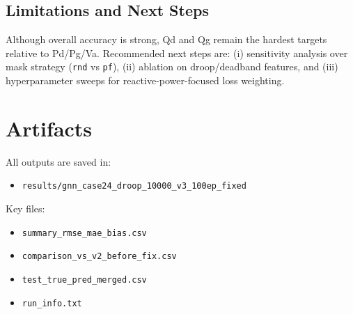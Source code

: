 \documentclass[11pt]{article}
\begin{document}
\subsection{Limitations and Next Steps}
Although overall accuracy is strong, Qd and Qg remain the hardest targets relative to Pd/Pg/Va. Recommended next steps are: (i) sensitivity analysis over mask strategy (\texttt{rnd} vs \texttt{pf}), (ii) ablation on droop/deadband features, and (iii) hyperparameter sweeps for reactive-power-focused loss weighting.

\section*{Artifacts}
All outputs are saved in:
\begin{itemize}
    \item \texttt{results/gnn\_case24\_droop\_10000\_v3\_100ep\_fixed}
\end{itemize}
Key files:
\begin{itemize}
    \item \texttt{summary\_rmse\_mae\_bias.csv}
    \item \texttt{comparison\_vs\_v2\_before\_fix.csv}
    \item \texttt{test\_true\_pred\_merged.csv}
    \item \texttt{run\_info.txt}
\end{itemize}
\end{document}
